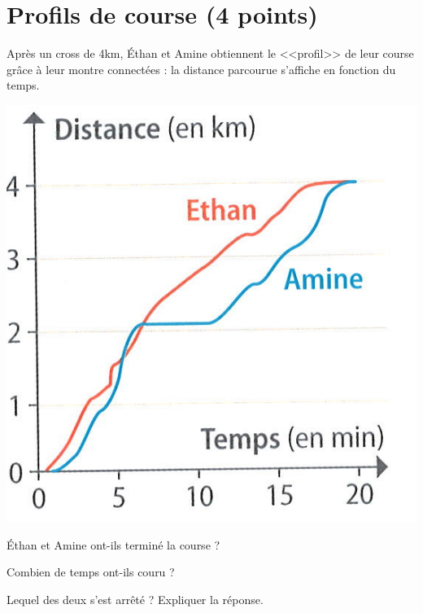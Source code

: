 \section{Profils de course (4 points)}

Après un cross de 4km, \'Ethan et Amine obtiennent le <<profil>> de leur course grâce à leur montre connectées : la distance parcourue s'affiche en fonction du temps.

\begin{center}
	\includegraphics[scale=0.5]{cross}
\end{center}

\begin{questions}
	\question[1] \'Ethan et Amine ont-ils terminé la course ?
	\fillwithdottedlines{3cm}
	
	\question[1] Combien de temps ont-ils couru ?
	\fillwithdottedlines{3cm}
	
	\question[2] Lequel des deux s'est arrêté ? Expliquer la réponse.
	\fillwithdottedlines{4cm}
\end{questions}